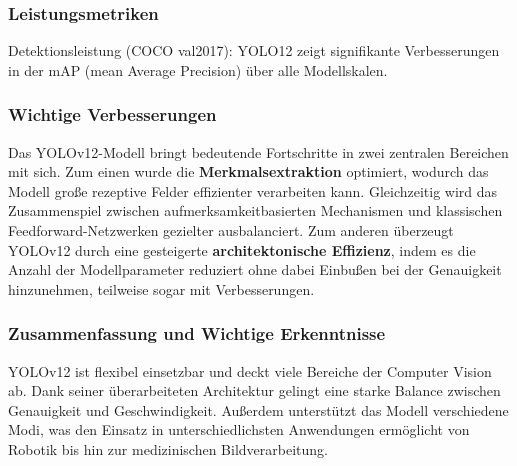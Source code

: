 \subsubsection{Leistungsmetriken}
Detektionsleistung (COCO val2017): YOLO12 zeigt signifikante Verbesserungen in der mAP (mean Average Precision) über alle Modellskalen.\\
\begin{table}[!htbp]
    \centering
    \caption{Vergleich verschiedener YOLOv12-Modelle}
    \end{table}
    \subsubsection{Wichtige Verbesserungen}
    Das YOLOv12-Modell bringt bedeutende Fortschritte in zwei zentralen Bereichen mit sich. Zum einen wurde die \textbf{Merkmalsextraktion} optimiert, wodurch das Modell große rezeptive Felder effizienter verarbeiten kann. Gleichzeitig wird das Zusammenspiel zwischen aufmerksamkeitbasierten Mechanismen und klassischen Feedforward-Netzwerken gezielter ausbalanciert. Zum anderen überzeugt YOLOv12 durch eine gesteigerte \textbf{architektonische Effizienz}, indem es die Anzahl der Modellparameter reduziert ohne dabei Einbußen bei der Genauigkeit hinzunehmen, teilweise sogar mit Verbesserungen.
    \subsubsection{Zusammenfassung und Wichtige Erkenntnisse}
    YOLOv12 ist flexibel einsetzbar und deckt viele Bereiche der Computer Vision ab. Dank seiner überarbeiteten Architektur gelingt eine starke Balance zwischen Genauigkeit und Geschwindigkeit. Außerdem unterstützt das Modell verschiedene Modi, was den Einsatz in unterschiedlichsten Anwendungen ermöglicht von Robotik bis hin zur medizinischen Bildverarbeitung.

    
